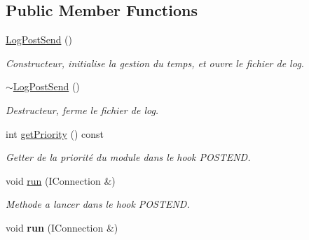\subsection*{Public Member Functions}
\begin{DoxyCompactItemize}
\item 
\hypertarget{class_log_post_send_aa99ee2407faeff9f87aa4e387cd29dc2}{}\hyperlink{class_log_post_send_aa99ee2407faeff9f87aa4e387cd29dc2}{Log\+Post\+Send} ()\label{class_log_post_send_aa99ee2407faeff9f87aa4e387cd29dc2}

\begin{DoxyCompactList}\small\item\em Constructeur, initialise la gestion du temps, et ouvre le fichier de log. \end{DoxyCompactList}\item 
\hypertarget{class_log_post_send_aaa2cd3259efc8e69276b7980e2c85a9d}{}\hyperlink{class_log_post_send_aaa2cd3259efc8e69276b7980e2c85a9d}{$\sim$\+Log\+Post\+Send} ()\label{class_log_post_send_aaa2cd3259efc8e69276b7980e2c85a9d}

\begin{DoxyCompactList}\small\item\em Destructeur, ferme le fichier de log. \end{DoxyCompactList}\item 
int \hyperlink{class_log_post_send_a9270fad33ee9c97d49c27ddaa30a746b}{get\+Priority} () const 
\begin{DoxyCompactList}\small\item\em Getter de la priorité du module dans le hook P\+O\+S\+T\+E\+N\+D. \end{DoxyCompactList}\item 
\hypertarget{class_log_post_send_a105dda604569fa4e3bbdca9f42f947f8}{}void \hyperlink{class_log_post_send_a105dda604569fa4e3bbdca9f42f947f8}{run} (I\+Connection \&)\label{class_log_post_send_a105dda604569fa4e3bbdca9f42f947f8}

\begin{DoxyCompactList}\small\item\em Methode a lancer dans le hook P\+O\+S\+T\+E\+N\+D. \end{DoxyCompactList}\item 
\hypertarget{class_log_post_send_a105dda604569fa4e3bbdca9f42f947f8}{}void {\bfseries run} (I\+Connection \&)\label{class_log_post_send_a105dda604569fa4e3bbdca9f42f947f8}

\end{DoxyCompactItemize}


